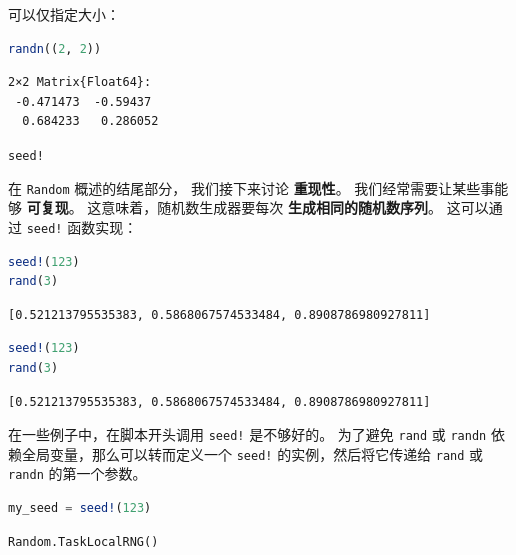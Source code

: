 \documentclass[
  notoc %
]{tufte-book}
\makeatletter
\newcommand{\passthrough}[1]{#1}
\renewcommand\subsubsection{%
\@startsection{subsubsection}{3}{\z@ }{-3.25ex\@plus -1ex \@minus -.2ex}{1.5ex \@plus .2ex}{\normalfont \normalsize \bfseries }
}
\makeatother
\begin{document}
可以仅指定大小：

\begin{lstlisting}[language=Julia]
randn((2, 2))
\end{lstlisting}

\begin{lstlisting}[language=Output]
2×2 Matrix{Float64}:
 -0.471473  -0.59437
  0.684233   0.286052
\end{lstlisting}

\hypertarget{sec:random_seed}{%
\subsubsection{\texorpdfstring{\texttt{seed!}}{seed!}}\label{sec:random_seed}}

在 \passthrough{\lstinline!Random!} 概述的结尾部分， 我们接下来讨论
\textbf{重现性}。 我们经常需要让某些事能够 \textbf{可复现}。
这意味着，随机数生成器要每次 \textbf{生成相同的随机数序列}。 这可以通过
\passthrough{\lstinline"seed!"} 函数实现：

\begin{lstlisting}[language=Julia]
seed!(123)
rand(3)
\end{lstlisting}

\begin{lstlisting}[language=Output]
[0.521213795535383, 0.5868067574533484, 0.8908786980927811]
\end{lstlisting}

\begin{lstlisting}[language=Julia]
seed!(123)
rand(3)
\end{lstlisting}

\begin{lstlisting}[language=Output]
[0.521213795535383, 0.5868067574533484, 0.8908786980927811]
\end{lstlisting}

在一些例子中，在脚本开头调用 \passthrough{\lstinline"seed!"}
是不够好的。 为了避免 \passthrough{\lstinline!rand!} 或
\passthrough{\lstinline!randn!} 依赖全局变量，那么可以转而定义一个
\passthrough{\lstinline"seed!"} 的实例，然后将它传递给
\passthrough{\lstinline!rand!} 或 \passthrough{\lstinline!randn!}
的第一个参数。

\begin{lstlisting}[language=Julia]
my_seed = seed!(123)
\end{lstlisting}

\begin{lstlisting}[language=Output]
Random.TaskLocalRNG()
\end{lstlisting}
\end{document}
